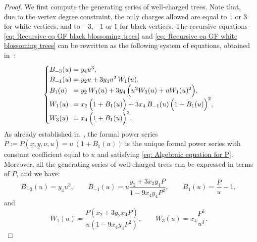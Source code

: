 \documentclass[11pt,reqno,tbtags]{amsart}
\newcommand{\ux}{\underline{x}}
\newcommand{\uy}{\underline{y}}
\numberwithin{equation}{section}
\numberwithin{theo}{section}
\theoremstyle{definition}
\begin{document}
\begin{proof}
We first compute the generating series of well-charged trees.
Note that, due to the vertex degree constraint, the only charges allowed are equal to $1$ or $3$ for white vertices, and to $-3, -1$ or $1$ for black vertices. The recursive equations \eqref{eq: Recursive eq GF black blossoming trees} and \eqref{eq: Recursive eq GF white blossoming trees} can be rewritten as the following system of equations, obtained in~\cite[Sec. 6.1]{BousquetMelouSchaeffer_Bipartite}:
\begin{equation*}
\centering
\begin{cases}
B_{-3}(u) & \hspace{-0.26cm}=  y_4 u^3,\\
B_{-1}(u) & \hspace{-0.26cm}=  y_2 u + 3 y_4 u^2 \, W_1(u),  \\
B_1(u)	  & \hspace{-0.26cm}= y_2 \, W_1(u) + 3y_4\,\Big(u^2 W_3(u) + u W_1(u)^2 \Big),\\
W_1(u)	  & \hspace{-0.26cm}=   x_2 \, \Big(1+B_{1}(u)\Big) + 3 x_4 \, B_{-1}(u) \, \Big(1+B_{1}(u) \Big)^2, \\
W_3(u)	  & \hspace{-0.26cm}=   x_4 \, \Big(1+B_{1}(u) \Big)^3.
\end{cases}
\end{equation*}
As already established in~\cite[Eq.(7) and (8)]{BousquetMelouSchaeffer_Bipartite}, the formal power series $P:=P(\ux,\uy,\nu,u) = u\, (1 + B_1(u))$ is the unique formal power series with constant coefficient equal to $u$ and satisfying \eqref{eq: Algebraic equation for P}. Moreover, all the generating series of well-charged trees can be expressed in terms of $P$, and we have:
\begin{equation*}
B_{-3}(u)=  y_4 u^3, \qquad
B_{-1}(u)=  u\frac{y_2+3x_2y_4P}{1-9x_4y_4P^2},   \qquad
B_1(u)	 = \frac{P}{u}-1,
\end{equation*}
and 
\begin{equation*}
W_1(u)= \frac{P(x_2+3y_2x_4P)}{u(1-9x_4y_4P^2)}, \qquad
W_3(u)=   x_4 \frac{P^3}{u^3}.
\end{equation*}


\end{proof}
\end{document}
